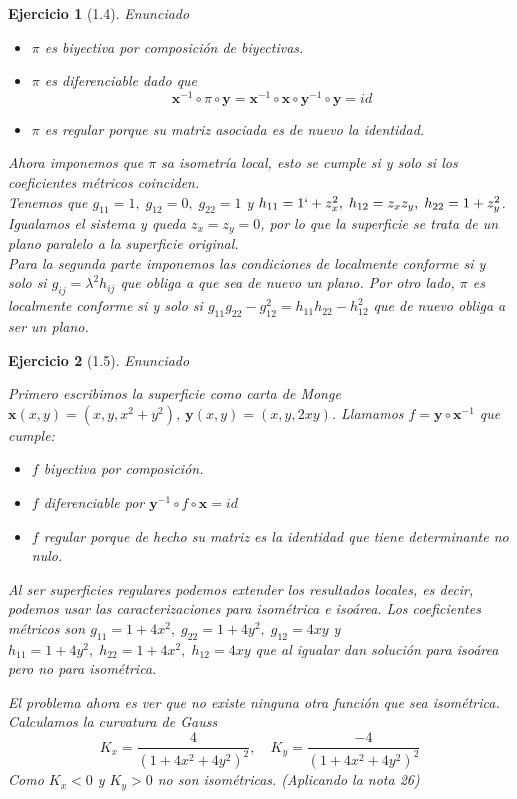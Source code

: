\documentclass[a4paper,10pt]{article}
\newtheorem{ejercicio}{Ejercicio}[section]
\begin{document}
\begin{ejercicio}[1.4]
	Enunciado
	
	\begin{itemize}
\item $\pi$ es biyectiva por composición de biyectivas.
\item $\pi$ es diferenciable dado que
\[
\mathbf{x}^{-1}\circ \pi \circ \mathbf{y}=\mathbf{x}^{-1}\circ \mathbf{x}\circ \mathbf{y}^{-1}\circ \mathbf{y}=id
\]
\item $\pi$ es regular porque su matriz asociada es de nuevo la identidad.
	\end{itemize}

Ahora imponemos que $\pi$ sa isometría local, esto se cumple si y solo si los coeficientes métricos coinciden.\\
Tenemos que $g_{11}=1,\; g_{12}=0,\;g_{22}=1$ y $h_{11}=1`+z_x^2,\;h_{12}=z_xz_y,\;h_{22}=1+z_y^2$. Igualamos el sistema y queda $z_x=z_y=0$, por lo que la superficie se trata de un plano paralelo a la superficie original.\\

Para la segunda parte imponemos las condiciones de localmente conforme si y solo si $g_{ij}=\lambda^2h_{ij}$ que obliga a que sea de nuevo un plano. Por otro lado, $\pi$ es localmente conforme si y solo si $g_{11}g_{22}-g_{12}^2=h_{11}h_{22}-h_{12}^2$ que de nuevo obliga a ser un plano.
\end{ejercicio}

\begin{ejercicio}[1.5]
Enunciado

Primero escribimos la superficie como carta de Monge $\mathbf{x}(x,y)=(x,y,x^2+y^2)$, $\mathbf{y}(x,y)=(x,y,2xy)$. Llamamos $f=\mathbf{y}\circ \mathbf{x}^{-1}$ que cumple:
\begin{itemize}
\item $f$ biyectiva por composición.
\item $f$ diferenciable por $\mathbf{y}^{-1}\circ f\circ \mathbf{x}=id$
\item $f$ regular porque de hecho su matriz es la identidad que tiene determinante no nulo.
\end{itemize}
Al ser superficies regulares podemos extender los resultados locales, es decir, podemos usar las caracterizaciones para isométrica e isoárea. Los coeficientes métricos son $g_{11}=1+4x^2,\; g_{22}=1+4y^2,\;g_{12}=4xy$ y $h_{11}=1+4y^2,\;h_{22}=1+4x^2,\;h_{12}=4xy$ que al igualar dan solución para isoárea pero no para isométrica.

El problema ahora es ver que no existe ninguna otra función que sea isométrica.\\
Calculamos la curvatura de Gauss
\[
K_x=\frac{4}{(1+4x^2+4y^2)^2},\quad K_y=\frac{-4}{(1+4x^2+4y^2)^2}
\]
Como $K_x<0$ y $K_y>0$ no son isométricas. (Aplicando la nota 26)
\end{ejercicio}
\end{document}
